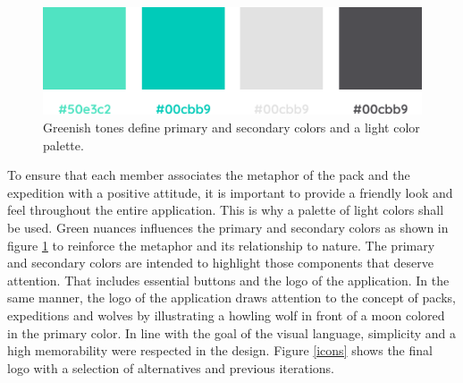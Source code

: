 \documentclass[12pt,numbers=noenddot,parskip,bibliography=totocnumbered,listof=totocnumbered,draft]{scrreprt}
\begin{document}
\begin{figure}
\centering
\includegraphics[width=\textwidth]{colors.png}
\caption[Color palette]{Greenish tones define primary and secondary colors and a light color palette.}
\label{colors}
\end{figure}

To ensure that each member associates the metaphor of the pack and the expedition with a positive attitude, it is important to provide a friendly look and feel throughout the entire application. This is why a palette of light colors shall be used. Green nuances influences the primary and secondary colors as shown in figure \ref{colors} to reinforce the metaphor and its relationship to nature. The primary and secondary colors are intended to highlight those components that deserve attention. That includes essential buttons and the logo of the application. In the same manner, the logo of the application draws attention to the concept of packs, expeditions and wolves by illustrating a howling wolf in front of a moon colored in the primary color. In line with the goal of the visual language, simplicity and a high memorability were respected in the design. Figure \ref{icons} shows the final logo with a selection of alternatives and previous iterations.
 
\end{document}
